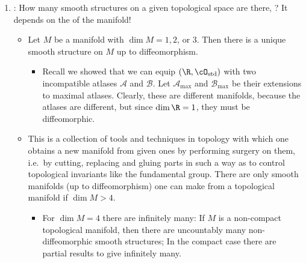\documentclass{article}
\begin{document}
\begin{enumerate}
\item {}: How many smooth structures on a given topological space are there, ? It depends on the  of the manifold!

\begin{itemize}
    \item Let $M$ be a manifold with $\dim M = 1, 2$, or $3$. Then there is a unique smooth structure on $M$ up to diffeomorphism. 
    \begin{itemize}[$\ast$]
        \item Recall we showed that we can equip $(\R,\cO_\mathrm{std})$ with two incompatible atlases $\mathscr{A}$ and $\mathscr{B}$. Let $\mathscr{A}_\mathrm{max}$ and $\mathscr{B}_\mathrm{max}$ be their extensions to maximal atlases. Clearly, these are different manifolds, because the atlases are different, but since $\dim \R=1$, they must be diffeomorphic.
    \end{itemize}
    \item {} {\tiny This is a collection of tools and techniques in topology with which one obtains a new manifold from given ones by performing surgery on them, i.e.\ by cutting, replacing and gluing parts in such a way as to control topological invariants like the fundamental group.} There are only  smooth manifolds (up to diffeomorphism) one can make from a topological manifold if $\dim M > 4$.
    \begin{itemize}[$\ast$]
        \item For $\dim M = 4$ there are infinitely many:  If $M$ is a non-compact topological manifold, then there are uncountably many non-diffeomorphic smooth structures; In the compact case there are partial results to give infinitely many.
    \end{itemize}
\end{itemize}
\end{enumerate}
\end{document}
